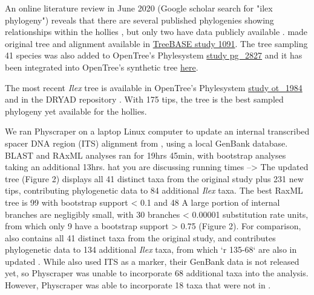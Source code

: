 \documentclass{bmcart}
\begin{document}
An online literature review in June 2020 (Google scholar search for "ilex phylogeny")
reveals that there are several published phylogenies showing relationships within
the hollies \cite{cuenoud2000molecular, manen2010history, setoguchi2000intersectional,
selbach2009new}, but only two have data publicly available \cite{gottlieb2005molecular, yao2020phylogeny}.
\cite{gottlieb2005molecular} made original tree and alignment available in
\href{https://treebase.org/treebase-web/search/study/summary.html?id=1091}{TreeBASE study 1091}.
The tree sampling 41 species was also added to
OpenTree's Phylesystem \href{https://tree.opentreeoflife.org/curator/study/edit/pg_2827/?tab=home}{study pg\_2827}
and it has been integrated into OpenTree's synthetic tree
\href{https://devtree.opentreeoflife.org/opentree/opentree12.3@mrcaott68451ott89474/Ilex-theizans--Ilex-dumosa}{here}.

The most recent \textit{Ilex} tree \cite{yao2020phylogeny} is available in
OpenTree's Phylesystem \href{https://tree.opentreeoflife.org/curator/study/view/ot_1984}{study ot\_1984}
and in the DRYAD repository \cite{yao2020dryad}.
With 175 tips, the \cite{yao2020phylogeny} tree is the best sampled phylogeny yet available for
the hollies.

We ran Physcraper on a laptop Linux computer to update an internal transcribed
spacer DNA region (ITS) alignment from \cite{gottlieb2005molecular}, using a local
GenBank database.  BLAST and RAxML analyses ran for 19hrs 45min, with bootstrap
analyses taking an additional 13hrs.
hat you are discussing running times -->
The updated \cite{gottlieb2005molecular} tree (Figure 2) displays
all 41 distinct
taxa from the original study plus 231 new tips, contributing phylogenetic data to
84 additional \textit{Ilex} taxa. The best RaxML tree is 99%
with bootstrap support < 0.1 and 48%
A large portion of internal branches are negligibly small, with 30 branches
< 0.00001 substitution rate units, from which only 9 have a bootstrap support > 0.75
(Figure 2).
For comparison, \cite{yao2020phylogeny} also contains all 41 distinct taxa from
the original
\cite{gottlieb2005molecular} study,
and contributes phylogenetic data to 134 additional \textit{Ilex} taxa, from which
`r 135-68` are also in updated \cite{gottlieb2005molecular}. While \cite{yao2020phylogeny} also used
ITS as a marker, their GenBank data is not released yet, so Physcraper was unable
to incorporate 68 additional taxa into the analysis. However, Physcraper was able
to incorporate 18 taxa that were not in \cite{yao2020phylogeny}.
\end{document}
